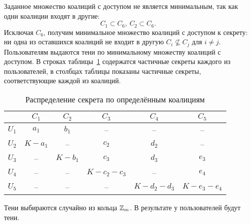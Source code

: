 Заданное множество коалиций с доступом не является минимальным, так как одни коалиции входят в другие:
    \[ C_1 \subset C_6, ~ C_2 \subset C_6. \]
Исключая $C_6$, получим минимальное множество коалиций с доступом к секрету: ни одна из оставшихся коалиций не входит в другую $C_i \nsubseteq C_j$ для $i \neq j$. Пользователям выдаются тени по минимальному множеству коалиций с доступом. В строках таблицы~\ref{tab:secret-share-coalition-2} содержатся частичные секреты каждого из пользователей, в столбцах таблицы показаны частичные секреты, соответствующие каждой из коалиций.

\begin{table}[!ht]
    \centering
    \caption{Распределение секрета по определённым коалициям\label{tab:secret-share-coalition-2}}
    \begin{tabular}{|c||c|c|c|c|c|}
        \hline
              & $C_1$     & $C_2$     & $C_3$           & $C_4$           & $C_5$  \\
        \hline \hline
        $U_1$ & $a_1$     & $b_1$     & --              & --              & -- \\
        $U_2$ & $K - a_1$ & --        & $c_2$           & $d_2$           & --\\
        $U_3$ & --        & $K - b_1$ & $c_3$           & $d_3$           & $e_3$ \\
        $U_4$ & --        & --        & $K - c_2 - c_3$ & --              & $e_4$ \\
        $U_5$ & --        & --        & --              & $K - d_2 - d_3$ & $K - e_3 - e_4$ \\
        \hline
    \end{tabular}
\end{table}

Тени выбираются случайно из кольца $\mathbb{\mathbb{Z}}_m$. В результате у пользователей будут тени. 
\exampleend



